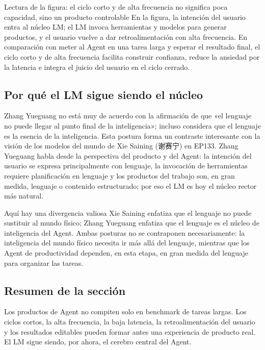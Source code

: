 \documentclass[a4paper]{article}
\begin{document}
\begin{knowledgebox}{Lectura de la figura: el ciclo corto y de alta frecuencia no significa poca capacidad, sino un producto controlable}
En la figura, la intención del usuario entra al núcleo LM; el LM invoca herramientas y modelos para generar productos, y el usuario vuelve a dar retroalimentación con alta frecuencia. En comparación con meter al Agent en una tarea larga y esperar el resultado final, el ciclo corto y de alta frecuencia facilita construir confianza, reduce la ansiedad por la latencia e integra el juicio del usuario en el ciclo cerrado.
\end{knowledgebox}

\subsection{Por qué el LM sigue siendo el núcleo}

Zhang Yueguang no está muy de acuerdo con la afirmación de que «el lenguaje no puede llegar al punto final de la inteligencia»; incluso considera que el lenguaje es la esencia de la inteligencia. Esta postura forma un contraste interesante con la visión de los modelos del mundo de Xie Saining (谢赛宁) en EP133. Zhang Yueguang habla desde la perspectiva del producto y del Agent: la intención del usuario se expresa principalmente con lenguaje, la invocación de herramientas requiere planificación en lenguaje y los productos del trabajo son, en gran medida, lenguaje o contenido estructurado; por eso el LM es hoy el núcleo rector más natural.

\begin{warningbox}{Aquí hay una divergencia valiosa}
Xie Saining enfatiza que el lenguaje no puede sustituir al mundo físico; Zhang Yueguang enfatiza que el lenguaje es el núcleo de inteligencia del Agent. Ambas posturas no se contraponen necesariamente: la inteligencia del mundo físico necesita ir más allá del lenguaje, mientras que los Agent de productividad dependen, en esta etapa, en gran medida del lenguaje para organizar las tareas.
\end{warningbox}

\subsection{Resumen de la sección}

Los productos de Agent no compiten solo en benchmark de tareas largas. Los ciclos cortos, la alta frecuencia, la baja latencia, la retroalimentación del usuario y los resultados editables pueden formar antes una experiencia de producto real. El LM sigue siendo, por ahora, el cerebro central del Agent.
\end{document}
